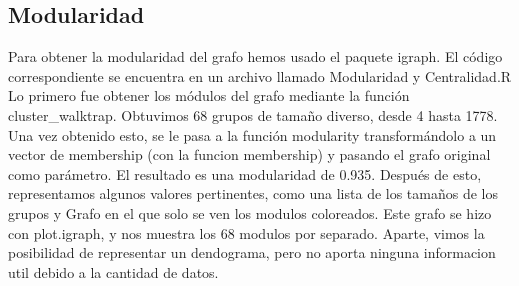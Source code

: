 \subsection{Modularidad}

Para obtener la modularidad del grafo hemos usado el paquete igraph. El código correspondiente se encuentra en un archivo llamado Modularidad y Centralidad.R
Lo primero fue obtener los módulos del grafo mediante la función cluster_walktrap. Obtuvimos 68 grupos de tamaño diverso, desde 4 hasta 1778. Una vez obtenido esto, se le pasa a la función modularity transformándolo a un vector de membership (con la funcion membership) y pasando el grafo original como parámetro. El resultado es una modularidad de 0.935.
Después de esto, representamos algunos valores pertinentes, como una lista de los tamaños de los grupos y Grafo en el que solo se ven los modulos coloreados.
Este grafo se hizo con plot.igraph, y nos muestra los 68 modulos por separado.
Aparte, vimos la posibilidad de representar un dendograma, pero no aporta ninguna informacion util debido a la cantidad de datos.




